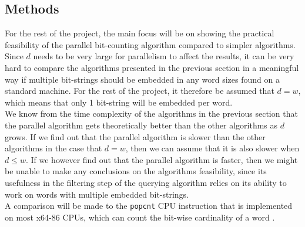 
\subsection{Methods}
% 
For the rest of the project, the main focus will be on showing the practical feasibility of the parallel bit-counting algorithm compared to simpler algorithms. 
Since $d$ needs to be very large for parallelism to affect the results, it can be very hard to compare the algorithms presented in the previous section in a meaningful way if multiple bit-strings should be embedded in any word sizes found on a standard machine. For the rest of the project, it therefore be assumed that $d=w$, which means that only 1 bit-string will be embedded per word.\\
We know from the time complexity of the algorithms in the previous section that the parallel algorithm gets theoretically better than the other algorithms as $d$ grows. If we find out that the parallel algorithm is slower than the other algorithms in the case that $d=w$, then we can assume that it is also slower when $d \leq w$. If we however find out that the parallel algorithm is faster, then we might be unable to make any conclusions on the algorithms feasibility, since its usefulness in the filtering step of the querying algorithm relies on its ability to work on words with multiple embedded bit-strings. \\
A comparison will be made to the \texttt{popcnt} CPU instruction that is implemented on most x64-86 CPUs, which can count the bit-wise cardinality of a word \cite{popcnt}.

